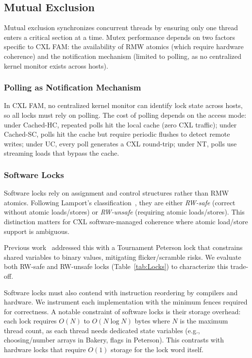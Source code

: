 \subsection{Mutual Exclusion}

Mutual exclusion synchronizes concurrent threads by ensuring only one thread enters a critical section at a time.
Mutex performance depends on two factors specific to CXL FAM: the availability of RMW atomics (which require hardware coherence) and the notification mechanism (limited to polling, as no centralized kernel monitor exists across hosts).

\subsubsection{Polling as Notification Mechanism}

In CXL FAM, no centralized kernel monitor can identify lock state across hosts, so all locks must rely on polling.
The cost of polling depends on the access mode:
under Cached-HC, repeated polls hit the local cache (zero CXL traffic);
under Cached-SC, polls hit the cache but require periodic flushes to detect remote writes;
under UC, every poll generates a CXL round-trip;
under NT, polls use streaming loads that bypass the cache.

\subsubsection{Software Locks}

Software locks rely on assignment and control structures rather than RMW atomics.
Following Lamport's classification~\cite{lamportMutualExclusionProblem,lamportMutualExclusionProblema}, they are either \emph{RW-safe} (correct without atomic loads/stores) or \emph{RW-unsafe} (requiring atomic loads/stores).
This distinction matters for CXL software-managed coherence where atomic load/store support is ambiguous.

Previous work~\cite{suetterleinSynchronizationCXLBased2024} addressed this with a Tournament Peterson lock that constrains shared variables to binary values, mitigating flicker/scramble risks.
We evaluate both RW-safe and RW-unsafe locks (Table~\ref{tab:Locks}) to characterize this trade-off.

Software locks must also contend with instruction reordering by compilers and hardware.
We instrument each implementation with the minimum fences required for correctness.
A notable constraint of software locks is their storage overhead: each lock requires $O(N)$ to $O(N \log N)$ bytes where $N$ is the maximum thread count, as each thread needs dedicated state variables (e.g., choosing/number arrays in Bakery, flags in Peterson).
This contrasts with hardware locks that require $O(1)$ storage for the lock word itself.

